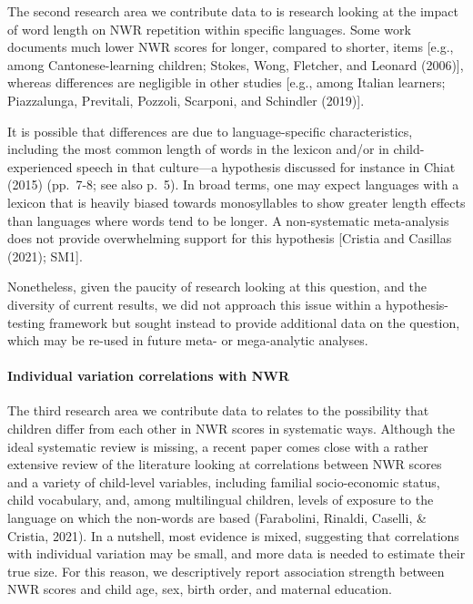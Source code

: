 \documentclass[
  american,
  ,man,floatsintext]{apa6}
\let\oldparagraph\paragraph
\renewcommand{\paragraph}[1]{\oldparagraph{#1}\mbox{}}
\begin{document}
The second research area we contribute data to is research looking at the impact of word length on NWR repetition within specific languages. Some work documents much lower NWR scores for longer, compared to shorter, items {[}e.g., among Cantonese-learning children; Stokes, Wong, Fletcher, and Leonard (2006){]}, whereas differences are negligible in other studies {[}e.g., among Italian learners; Piazzalunga, Previtali, Pozzoli, Scarponi, and Schindler (2019){]}.

It is possible that differences are due to language-specific characteristics, including the most common length of words in the lexicon and/or in child-experienced speech in that culture---a hypothesis discussed for instance in Chiat (2015) (pp.~7-8; see also p.~5). In broad terms, one may expect languages with a lexicon that is heavily biased towards monosyllables to show greater length effects than languages where words tend to be longer. A non-systematic meta-analysis does not provide overwhelming support for this hypothesis {[}Cristia and Casillas (2021); SM1{]}.

Nonetheless, given the paucity of research looking at this question, and the diversity of current results, we did not approach this issue within a hypothesis-testing framework but sought instead to provide additional data on the question, which may be re-used in future meta- or mega-analytic analyses.

\hypertarget{individual-variation-correlations-with-nwr}{%
\paragraph{Individual variation correlations with NWR}\label{individual-variation-correlations-with-nwr}}

The third research area we contribute data to relates to the possibility that children differ from each other in NWR scores in systematic ways. Although the ideal systematic review is missing, a recent paper comes close with a rather extensive review of the literature looking at correlations between NWR scores and a variety of child-level variables, including familial socio-economic status, child vocabulary, and, among multilingual children, levels of exposure to the language on which the non-words are based (Farabolini, Rinaldi, Caselli, \& Cristia, 2021). In a nutshell, most evidence is mixed, suggesting that correlations with individual variation may be small, and more data is needed to estimate their true size. For this reason, we descriptively report association strength between NWR scores and child age, sex, birth order, and maternal education.
\end{document}
